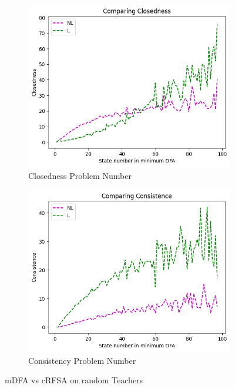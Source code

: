 \begin{figure}[!htb]
\begin{subfigure}[b]{0.25\textwidth}
  \end{subfigure}
  \begin{subfigure}[b]{0.25\textwidth}
    \includegraphics[width=\textwidth]{../statistics/plots/BenchMark/Closedness.png}
    \caption{Closedness Problem Number}
    \label{fig:ClosednessBenchMarkCompare}
  \end{subfigure}
  \begin{subfigure}[b]{0.25\textwidth}
    \includegraphics[width=\textwidth]{../statistics/plots/BenchMark/Consistence.png}
    \caption{Consistency Problem Number}
    \label{fig:ConsistenceBenchMarkCompare}
  \end{subfigure}
  \caption{mDFA vs cRFSA on random Teachers}
  \label{fig:benchmark}
\end{figure}

